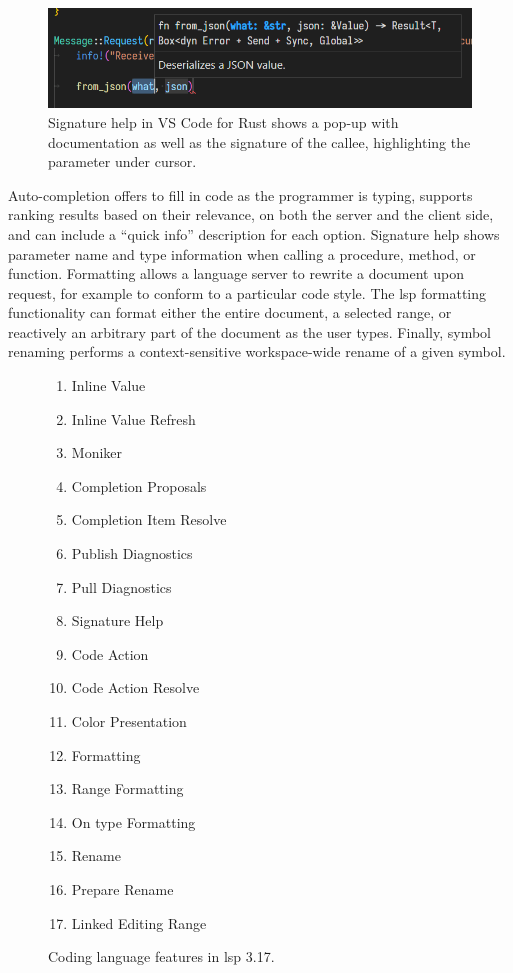 \begin{figure}
	\includegraphics[width=1.00\textwidth]{resources/code_signature_help.png}
	\caption{Signature help in VS Code for Rust shows a pop-up with
	documentation as well as the signature of the callee, highlighting the
	parameter under cursor.}
\end{figure}

Auto-completion offers to fill in code as the programmer is typing, supports
ranking results based on their relevance, on both the server and the client
side, and can include a ``quick info'' description for each option. Signature
help shows parameter name and type information when calling a procedure, method,
or function. Formatting allows a language server to rewrite a document upon
request, for example to conform to a particular code style. The \acrshort{lsp}
formatting functionality can format either the entire document, a selected
range, or reactively an arbitrary part of the document as the user types.
Finally, symbol renaming performs a context-sensitive workspace-wide rename of a
given symbol.

\begin{figure}[t]\centering
	\begin{multicols}{3}
	\begin{enumerate}
		\item Inline Value
		\item Inline Value Refresh
		\item Moniker
		\item Completion Proposals \org
		\item Completion Item Resolve \org
		\item Publish Diagnostics
		\item Pull Diagnostics
		\item Signature Help \org
		\item Code Action
		\item Code Action Resolve
		\item Color Presentation
		\item Formatting \org
		\item Range Formatting \org
		\item On type Formatting \org
		\item Rename \org
		\item Prepare Rename
		\item Linked Editing Range
	\end{enumerate}
	\end{multicols}

	\caption{Coding language features in \acrshort{lsp} 3.17.}
	\label{fig:coding-requests}
\end{figure}

